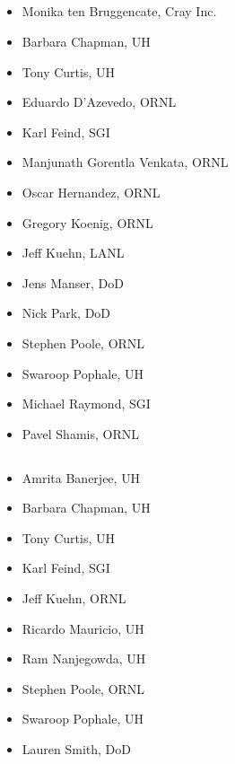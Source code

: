 \subsection*{}
\begin{multicols}{2}
\begin{itemize}
\setlength\itemsep{0.1em}
\item Monika ten Bruggencate, Cray Inc.
\item Barbara Chapman, \ac{UH}
\item Tony Curtis, \ac{UH}
\item Eduardo D’Azevedo, \ac{ORNL}
\item Karl Feind, \ac{SGI}
\item Manjunath Gorentla Venkata, \ac{ORNL}
\item Oscar Hernandez, \ac{ORNL}
\item Gregory Koenig, \ac{ORNL}
\item Jeff Kuehn, \ac{LANL}
\item Jens Manser, \ac{DoD}
\item Nick Park, \ac{DoD}
\item Stephen Poole, \ac{ORNL}
\item Swaroop Pophale, \ac{UH}
\item Michael Raymond, \ac{SGI}
\item Pavel Shamis, \ac{ORNL}
\end{itemize}
\end{multicols}

\subsection*{}
\begin{multicols}{2}
\begin{itemize}
\setlength\itemsep{0.1em}
\item Amrita Banerjee, \ac{UH}
\item Barbara Chapman, \ac{UH}
\item Tony Curtis, \ac{UH}
\item Karl Feind, \ac{SGI}
\item Jeff Kuehn, \ac{ORNL}
\item Ricardo Mauricio, \ac{UH}
\item Ram Nanjegowda, \ac{UH}
\item Stephen Poole, \ac{ORNL}
\item Swaroop Pophale, \ac{UH}
\item Lauren Smith, \ac{DoD}
\end{itemize}
\end{multicols}

